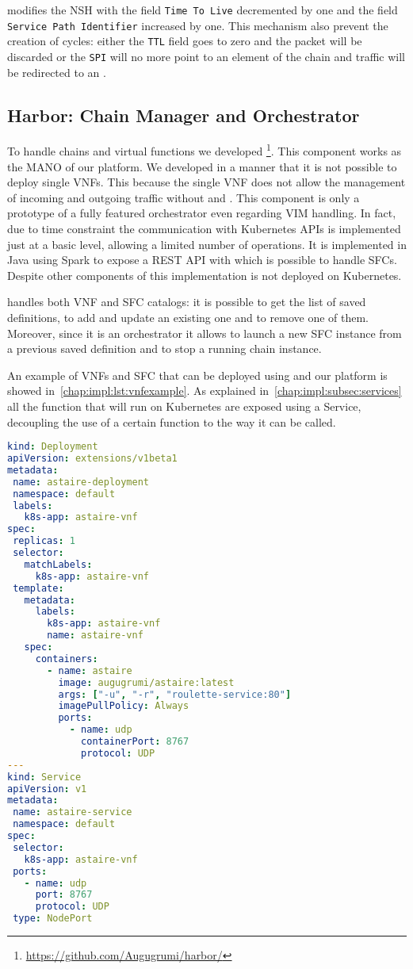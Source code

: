 \astaire{} modifies the NSH with the field
\texttt{Time To Live} decremented by one and the field \texttt{Service Path
Identifier} increased by one. This mechanism also prevent the creation of
cycles: either the \texttt{TTL} field goes to zero
and the packet will be discarded or the \texttt{SPI} will no more point to an
element of the chain and traffic will be redirected to an \egress{}.



\subsection{Harbor: Chain Manager and Orchestrator}
To handle chains and virtual functions we developed
\harbor{}\footnote{\url{https://github.com/Augugrumi/harbor/}}. This component
works as the MANO of our platform. We developed \harbor{} in a manner that it
is not possible to deploy single VNFs. This because the single VNF does not
allow the management of incoming and outgoing traffic without \ingresses{} and
\egresses{}. This component is only a prototype of a fully featured orchestrator
even regarding VIM handling. In fact, due to time constraint the communication
with Kubernetes APIs is implemented just at a basic level, allowing a limited
number of operations. It is implemented in Java using Spark to expose a REST API
with which is possible to handle SFCs. Despite other components of this
implementation \harbor{} is not deployed on Kubernetes.

\harbor{} handles both VNF and SFC catalogs: it is possible to get the list of
saved definitions, to add and update an existing one and to remove one of them.
Moreover, since it is an orchestrator it allows to launch a new SFC instance
from a previous saved definition and to stop a running chain instance.

An example of VNFs and SFC that can be deployed using \harbor{} and our platform
is showed in~\ref{chap:impl:lst:vnfexample}. As explained 
in~\ref{chap:impl:subsec:services} all the function that will run on Kubernetes
are exposed using a Service, decoupling the use of a certain function to the way
it can be called.
\begin{lstlisting}[caption={Example of VNF definition}, captionpos=b,
                   language=yaml, label=chap:impl:lst:vnfexample]
kind: Deployment
apiVersion: extensions/v1beta1
metadata:
 name: astaire-deployment
 namespace: default
 labels:
   k8s-app: astaire-vnf
spec:
 replicas: 1
 selector:
   matchLabels:
     k8s-app: astaire-vnf
 template:
   metadata:
     labels:
       k8s-app: astaire-vnf
       name: astaire-vnf
   spec:
     containers:
       - name: astaire
         image: augugrumi/astaire:latest
         args: ["-u", "-r", "roulette-service:80"]
         imagePullPolicy: Always
         ports:
           - name: udp
             containerPort: 8767
             protocol: UDP
---
kind: Service
apiVersion: v1
metadata:
 name: astaire-service
 namespace: default
spec:
 selector:
   k8s-app: astaire-vnf
 ports:
   - name: udp
     port: 8767
     protocol: UDP
 type: NodePort
\end{lstlisting}

